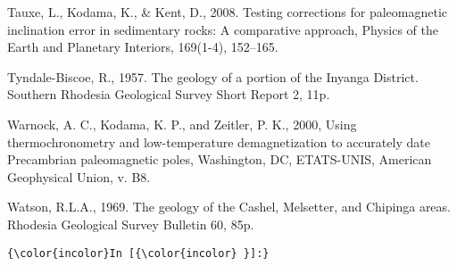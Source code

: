 \documentclass{article}
\begin{document}
Tauxe, L., Kodama, K., \& Kent, D., 2008. Testing corrections for
paleomagnetic inclination error in sedimentary rocks: A comparative
approach, Physics of the Earth and Planetary Interiors, 169(1-4),
152--165.

Tyndale-Biscoe, R., 1957. The geology of a portion of the Inyanga
District. Southern Rhodesia Geological Survey Short Report 2, 11p.

Warnock, A. C., Kodama, K. P., and Zeitler, P. K., 2000, Using
thermochronometry and low-temperature demagnetization to accurately date
Precambrian paleomagnetic poles, Washington, DC, ETATS-UNIS, American
Geophysical Union, v. B8.

Watson, R.L.A., 1969. The geology of the Cashel, Melsetter, and Chipinga
areas. Rhodesia Geological Survey Bulletin 60, 85p.

    \begin{Verbatim}[commandchars=\\\{\}]
{\color{incolor}In [{\color{incolor} }]:} 
\end{Verbatim}


    
    
    
    
\end{document}
